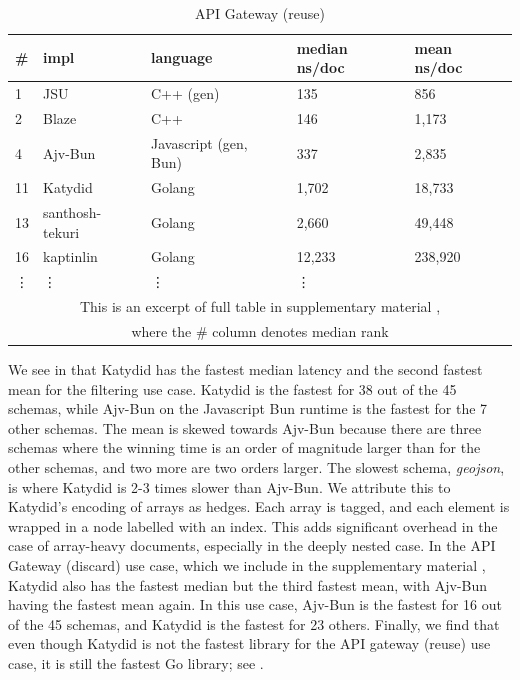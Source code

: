 \documentclass[runningheads]{llncs}
\newcommand{\supplementarymaterial}{%
  supplementary material\xspace%
}
\begin{document}
\begin{table}
\caption{API Gateway (reuse)}
\label{table_api_gateway_reuse}
\begin{center}
\begin{tabular}{ll|l|ll}
\midrule
\# & impl & language & median ns/doc & mean ns/doc \\
\midrule
1 & JSU & C++ (gen) & 135 & 856 \\
2 & Blaze & C++ & 146 & 1,173 \\
4 & Ajv-Bun & Javascript (gen, Bun) & 337 & 2,835 \\
11 & Katydid & Golang & 1,702 & 18,733 \\
13 & santhosh-tekuri & Golang & 2,660 & 49,448 \\
16 & kaptinlin & Golang & 12,233 & 238,920 \\
\vdots & \vdots & \vdots & \vdots \\
\multicolumn{5}{c}{This is an excerpt of full table in \supplementarymaterial,}\\
\multicolumn{5}{c}{where the \# column denotes median rank} \\
\end{tabular}
\end{center}
\end{table}

We see in  that Katydid has the fastest median latency and the second fastest mean for the filtering use case.
Katydid is the fastest for 38 out of the 45 schemas, while Ajv-Bun on the Javascript Bun runtime is the fastest for the 7 other schemas.
The mean is skewed towards Ajv-Bun because there are three schemas where the winning time is an order of magnitude larger than for the other schemas, and two more are two orders larger.
The slowest schema, \textit{geojson}, is where Katydid is 2-3 times slower than Ajv-Bun.
We attribute this to Katydid's encoding of arrays as hedges. 
Each array is tagged, and each element is wrapped in a node labelled with an index. 
This adds significant overhead in the case of array-heavy documents, especially in the deeply nested case.
In the API Gateway (discard) use case, which we include in the \supplementarymaterial, Katydid also has the fastest median but the third fastest mean, with Ajv-Bun having the fastest mean again.
In this use case, Ajv-Bun is the fastest for 16 out of the 45 schemas, and Katydid is the fastest for 23 others.
Finally, we find that even though Katydid is not the fastest library for the API gateway (reuse) use case, it is still the fastest Go library; see .
\end{document}
